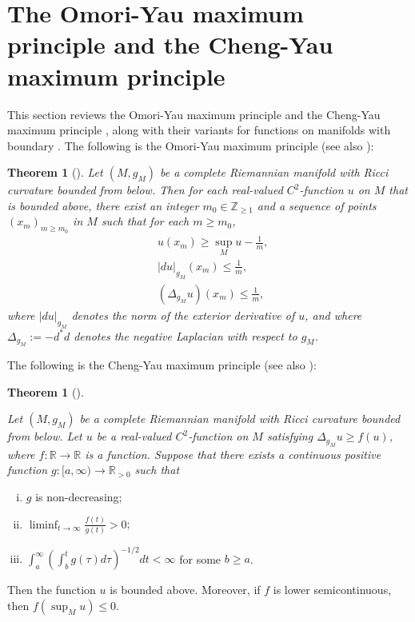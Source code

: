 \documentclass[12pt]{article}
\theoremstyle{definition}
\newtheorem{theo}[defi]{Theorem}
\def\R{{\mathbb R}}
\def\Z{{\mathbb Z}}
\begin{document}
\section{The Omori-Yau maximum principle and the Cheng-Yau maximum principle}\label{3}
This section reviews the Omori-Yau maximum principle \cite{Omo1, Yau1} and the Cheng-Yau maximum principle \cite{CY1}, along with their variants for functions on manifolds with boundary \cite{LM1}. The following is the Omori-Yau maximum principle \cite{Omo1, Yau1} (see also \cite[Lemma 3.1]{LM1}):
\begin{theo}[\cite{Omo1, Yau1}]{\it Let $(M, g_M)$ be a complete Riemannian manifold with Ricci curvature bounded from below. Then for each real-valued $C^2$-function $u$ on $M$ that is bounded above, there exist an integer $m_0 \in \Z_{\geq 1}$ and a sequence of points $(x_m)_{m \geq m_0}$ in $M$ such that for each $m \geq m_0$,
\begin{align*}
&u(x_m) \geq \sup_M u - \frac{1}{m}, \\
&|du|_{g_M}(x_m) \leq \frac{1}{m}, \\
&(\Delta_{g_M} u)(x_m) \leq \frac{1}{m},
\end{align*}
where $|du|_{g_M}$ denotes the norm of the exterior derivative of $u$, and where $\Delta_{g_M} := -d^{\ast}d$ denotes the negative Laplacian with respect to $g_M$.
}
\end{theo}

The following is the Cheng-Yau maximum principle \cite{CY1} (see also \cite[Lemma 3.3]{LM1}):

\begin{theo}[\cite{CY1}]\label{C-Ym}{\it Let $(M, g_M)$ be a complete Riemannian manifold with Ricci curvature bounded from below. Let $u$ be a real-valued $C^2$-function on $M$ satisfying $\Delta_{g_M} u \geq f(u)$, where $f:\R\rightarrow \R$ is a function. Suppose that there exists a continuous positive function $g:[a,\infty)\rightarrow \R_{>0}$ such that
\begin{enumerate}[(i)]
\item $g$ is non-decreasing;
\item $\liminf_{t\to\infty}\frac{f(t)}{g(t)}>0$;
\item $\int_a^\infty(\int_b^tg(\tau)d\tau)^{-1/2}dt<\infty$ for some $b\geq a$.
\end{enumerate}
Then the function $u$ is bounded above. Moreover, if $f$ is lower semicontinuous, then $f(\sup_M u)\leq 0$.
}
\end{theo}
\end{document}
